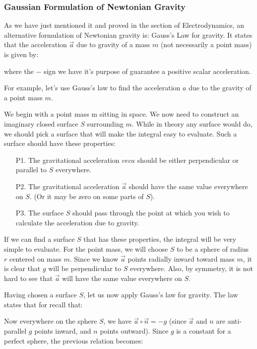 	\subsubsection{Gaussian Formulation of Newtonian Gravity}
	As we have just mentioned it and proved in the section of Electrodynamics, an alternative formulation of Newtonian gravity is: Gauss’s Law for gravity. It states that the acceleration $\vec{a}$ due to gravity of a mass $m$ (not necessarily a point mass) is given by:
	
	where the $-$ sign we have it's purpose of guarantee a positive scalar acceleration.
	
	For example, let's use Gauss's law to find the acceleration $a$ due to the gravity of a point mass $m$.

	We begin with a point mass m sitting in space. We now need to construct an imaginary closed surface $S$ surrounding $m$. While in theory any surface would do, we should pick a surface that will make the integral easy to evaluate. Such a surface should have these properties:
	\begin{enumerate}
		\item[P1.] The gravitational acceleration $vec{a}$ should be either perpendicular or parallel to $S$ everywhere.

		\item[P2.] The gravitational acceleration $\vec{a}$ should have the same value everywhere on $S$. (Or it may be zero on some parts of $S$).

		\item[P3.] The surface $S$ should pass through the point at which you wish to calculate the acceleration due to gravity.
	\end{enumerate}
	If we can find a surface $S$ that has these properties, the integral will be very simple to evaluate. For the point mass, we will choose $S$ to be a sphere of radius $r$ centered on mass $m$. Since we know $\vec{a}$ points radially
inward toward mass $m$, it is clear that $g$ will be perpendicular to $S$ everywhere. Also, by symmetry, it is not hard to see that $\vec{a}$ will have the same value everywhere on $S$. 

	Having chosen a surface $S$, let us now apply Gauss’s law for gravity. The law states that for recall that:
	
	Now everywhere on the sphere $S$, we have $\vec{a}\circ\vec{n}=-g$ (since $\vec{a}$ and $n$ are anti-parallel $g$ points inward, and $n$ points
outward). Since $g$ is a constant for a perfect sphere, the previous relation becomes:
	
